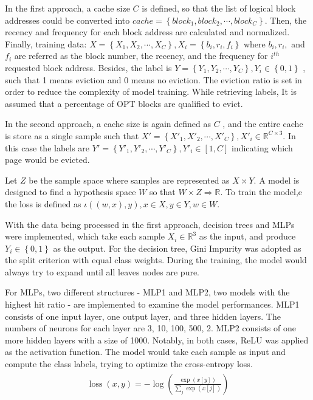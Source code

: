 \documentclass[letterpaper,twocolumn,10pt]{article}
\begin{document}
In the first approach, a cache size $C$ is defined, so that the list of logical block addresses could be converted into $cache = \left \{ block_1, block_2,\cdots , block_C \right \}$. Then, the recency and frequency for each block address are calculated and normalized. Finally, training data: $X = \left \{ X_1, X_2, \cdots, X_C \right \}, X_i = \left \{ b_i, r_i, f_i \right \}$ where $b_i, r_i,$ and $f_i$ are referred as the block number, the recency, and the frequency for $i^{th}$ requested block address. Besides, the label is $Y = \left \{Y_1, Y_2, \cdots, Y_C\right\}, Y_i \in \left \{ 0,1 \right \}$ , such that 1 means eviction and 0 means no eviction. The eviction ratio is set in order to reduce the complexity of model training. While retrieving labels, It is assumed that a percentage of OPT blocks are qualified to evict.

In the second approach, a cache size is again defined as $C$ , and the entire cache is store as a single sample such that ${X}' = \left \{ {{X}'}_1, {{X}'}_2, \cdots, {{X}'}_C \right \}, {{X}'}_i \in \mathbb{R}^{C\times 3}$. In this case the labels are ${Y}' = \left \{{Y}'_1, {Y}'_2, \cdots, {Y}'_C\right\}, {Y}'_i \in [1,C]$ indicating which page would be evicted.

Let $Z$ be the sample space where samples are represented as $X\times Y$. A model is designed to find a hypothesis space $W$ so that $W\times Z \Rightarrow \mathbb{R}$. To train the model,e the loss is defined as $\iota\left ( (w,x),y \right ), x\in X, y \in Y, w \in W$.

With the data being processed in the first approach, decision trees and MLPs were implemented, which take each sample $X_i \in \mathbb{R}^{3}$ as the input, and produce $Y_i \in \left\{0,1\right\}$ as the output. For the decision tree, Gini Impurity\cite{brodley1995multivariate} was adopted as the split criterion with equal class weights. During the training, the model would always try to expand until all leaves nodes are pure. 


For MLPs, two different structures - MLP1 and MLP2, two models with the highest hit ratio - are implemented to examine the model performances. MLP1 consists of one input layer, one output layer, and three hidden layers. The numbers of neurons for each layer are 3, 10, 100, 500, 2. MLP2 consists of one more hidden layers with a size of 1000. Notably, in both cases, ReLU was applied as the activation function. The model would take each sample as input and compute the class labels, trying to optimize the cross-entropy loss.
\begin{align} 
\begin{split}
\operatorname{loss}(x, y)=-\log \left(\frac{\exp (x[y])}{\sum_{j} \exp (x[j])}\right)
\end{split}         
\end{align}
\end{document}
